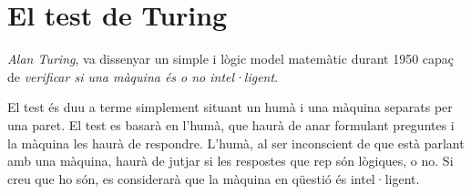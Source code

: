 \section{El test de Turing}

\emph{Alan Turing}, va dissenyar un simple i lògic model matemàtic durant 1950 capaç de \emph{verificar si una màquina és o no intel·ligent}.

El test és duu a terme simplement situant un humà i una màquina separats per una paret. El test es basarà en l'humà, que haurà de anar formulant preguntes i la màquina les haurà de respondre. L'humà, al ser inconscient de que està parlant amb una màquina, haurà de jutjar si les respostes que rep són lògiques, o no. Si creu que ho són, es considerarà que la màquina en qüestió és intel·ligent. \cite{Matur}
